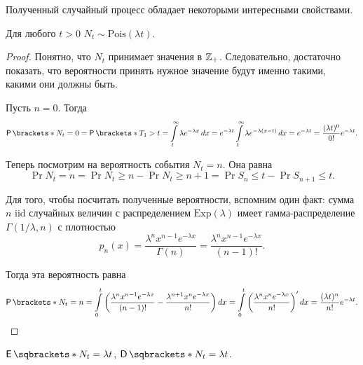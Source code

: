 Полученный случайный процесс обладает некоторыми интересными свойствами.
\begin{property}
	Для любого \(t > 0\) \(N_{t} \sim \mathrm{Pois}(\lambda t)\).
\end{property}
\begin{proof}
	Понятно, что \(N_{t}\) принимает значения в \(\mathbb{Z}_{+}\). Следовательно, 
	достаточно показать, что вероятности принять нужное значение будут именно 
	такими, какими они должны быть.
	
	Пусть \(n = 0\). Тогда
	\[
		\Pr{N_{t} = 0} = \Pr{T_{1} > t} = \int\limits_{t}^{\infty} \lambda 
		e^{-\lambda x}\diff x = e^{-\lambda t} \int\limits_{t}^{\infty} \lambda 
		e^{-\lambda(x - t)}\diff x = e^{-\lambda t} = 
		\frac{(\lambda t)^{0}}{0!}e^{-\lambda t}.
	\]
	
	Теперь посмотрим на вероятность события \(N_{t} = n\). Она равна
	\[
		\Pr{N_{t} = n} = \Pr{N_{t} \geq n} - \Pr{N_{t} \geq n + 1} = \Pr{S_{n} 
		\leq t} - \Pr{S_{n + 1} \leq t}.
	\]
	
	Для того, чтобы посчитать полученные вероятности, вспомним один факт: сумма 
	\(n\) iid случайных величин с распределением \(\mathrm{Exp}(\lambda)\) 
	имеет гамма-распределение \(\Gamma(1/\lambda, n)\) с плотностью
	\[
		p_{n}(x) = \frac{\lambda^{n}x^{n - 1}e^{-\lambda x}}{\Gamma(n)} = 
		\frac{\lambda^{n}x^{n - 1}e^{-\lambda x}}{(n - 1)!}.
	\]
	
	Тогда эта вероятность равна
	\[
		\Pr{N_{t} = n} = \int\limits_{0}^{t} \left(\frac{\lambda^{n}x^{n - 
		1}e^{-\lambda x}}{(n - 1)!} - \frac{\lambda^{n + 1}x^{n}e^{-\lambda 
		x}}{n!}\right)\diff x = \int\limits_{0}^{t} 
		\left(\frac{\lambda^{n}x^{n}e^{-\lambda x}}{n!}\right)'\diff x = 
		\frac{(\lambda t)^{n}}{n!}e^{-\lambda t}. \qedhere
	\]
\end{proof}
\begin{consequence}
	\(\E{N_{t}} = \lambda t\), \(\D{N_{t}} = \lambda t\).
\end{consequence}


